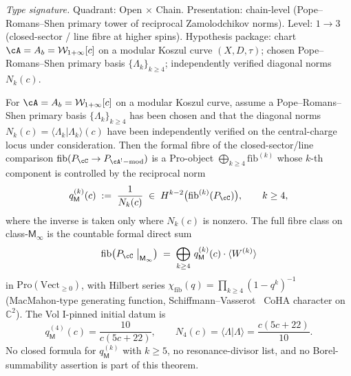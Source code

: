 \begin{theorem}
\label{thm:hdm-class-m-infty-fibre}
\emph{Type signature.} Quadrant: Open $\times$ Chain. Presentation:
chain-level (Pope--Romans--Shen primary tower of reciprocal
Zamolodchikov norms). Level: $1\!\to\!3$ (closed-sector / line fibre
at higher spins). Hypothesis package: chart $\cA = A_b =
\mathcal{W}_{1+\infty}[c]$ on a modular Koszul curve $(X, D, \tau)$;
chosen Pope--Romans--Shen primary basis $\{\Lambda_k\}_{k\geq 4}$;
independently verified diagonal norms $N_k(c)$.

For $\cA = A_b = \mathcal W_{1+\infty}[c]$ on a modular Koszul curve,
assume a Pope--Romans--Shen primary basis
$\{\Lambda_k\}_{k\geq 4}$ has been chosen and that the diagonal norms
$N_k(c)=\langle\Lambda_k|\Lambda_k\rangle(c)$ have been independently
verified on the central-charge locus under consideration. Then the
formal fibre of the closed-sector/line comparison
$\mathrm{fib}(P_\cC\to P_{\cA^!\mathrm{-mod}})$ is a $\mathrm{Pro}$-object
$\bigoplus_{k\geq 4}\mathrm{fib}^{(k)}$ whose $k$-th component is
controlled by the reciprocal norm
\begin{equation}\label{eq:hdm-minfty-fibre-generator}
q_\mathsf M^{(k)}(c)
\;:=\;\frac{1}{N_k(c)}
\;\in\;H^{k-2}\bigl(\mathrm{fib}^{(k)}(P_\cC)\bigr),
\qquad k\geq 4,
\end{equation}
where the inverse is taken only where $N_k(c)$ is nonzero. The full
fibre class on class-$\mathsf M_\infty$ is the countable formal direct
sum
\begin{equation}\label{eq:hdm-minfty-fibre-total}
\mathrm{fib}\bigl(P_\cC\bigm|_{\mathsf M_\infty}\bigr)
\;=\;\bigoplus_{k\geq 4}\, q_\mathsf M^{(k)}(c)\cdot\langle W^{(k)}\rangle
\end{equation}
in $\mathrm{Pro}(\mathrm{Vect}_{\geq 0})$, with Hilbert series
$\chi_{\mathrm{fib}}(q) = \prod_{k\geq 4}(1-q^k)^{-1}$ (MacMahon-type
generating function, Schiffmann--Vasserot~\cite{SchiffmannVasserot13}
CoHA character on $\mathbb C^2$). The Vol I-pinned initial datum is
\begin{equation}\label{eq:hdm-minfty-low-weights}
q_\mathsf M^{(4)}(c)=\frac{10}{c(5c+22)},
\qquad
N_4(c)=\langle\Lambda|\Lambda\rangle=\frac{c(5c+22)}{10}.
\end{equation}
No closed formula for $q_\mathsf M^{(k)}$ with $k\geq 5$, no
resonance-divisor list, and no Borel-summability assertion is part of
this theorem.
\end{theorem}

